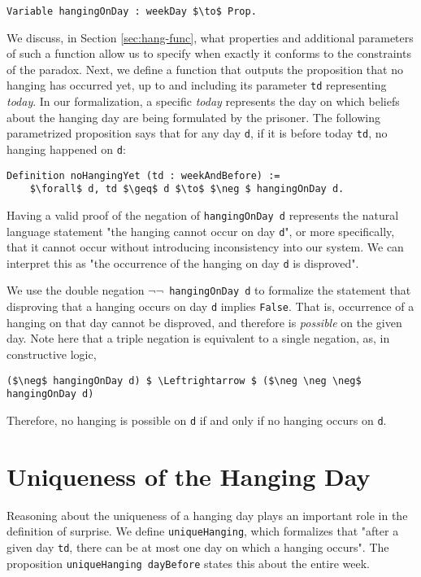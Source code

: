 \documentclass[runningheads]{llncs}
\begin{document}
\begin{lstlisting}[mathescape=true]
  Variable hangingOnDay : weekDay $\to$ Prop.
\end{lstlisting}

We discuss, in Section \ref{sec:hang-func}, what properties and additional parameters of
such a function allow us to specify when exactly it conforms to the constraints of the paradox.
Next, we define a function that outputs the proposition that no hanging has occurred
yet, up to and including its parameter {\tt td} representing \emph{today}.
In our formalization, a specific \emph{today} represents the day on which beliefs about
the hanging day are being formulated by the prisoner.
The following parametrized proposition says that for any day {\tt d}, if it is before today {\tt td}, no hanging
happened on {\tt d}:

\begin{lstlisting}[mathescape=true]
  Definition noHangingYet (td : weekAndBefore) :=
    $\forall$ d, td $\geq$ d $\to$ $\neg $ hangingOnDay d.
\end{lstlisting}

Having a valid proof of the negation of {\tt hangingOnDay d} represents the natural language
statement "the hanging cannot occur on day {\tt d}", or more specifically, that it
cannot occur without introducing inconsistency into our system. We can interpret
this as "the occurrence of the hanging on day {\tt d} is disproved".

We use the double negation {\tt $\neg \neg$ hangingOnDay d} to formalize the statement
that disproving that a hanging occurs on day {\tt d} implies {\tt False}. That is,
occurrence of a hanging on that day cannot be disproved, and therefore is
\emph{possible} on the given day. Note here that a triple negation is
equivalent to a single negation, as, in constructive logic,

\begin{lstlisting}[mathescape=true]
  ($\neg$ hangingOnDay d) $ \Leftrightarrow $ ($\neg \neg \neg$ hangingOnDay d)
\end{lstlisting}

Therefore, no hanging is possible on {\tt d} if and only if no hanging occurs on
{\tt d}.

\section{Uniqueness of the Hanging Day }
\label{sec:unique}

Reasoning about the uniqueness of a hanging day plays an important role in the
definition of surprise.
We define {\tt uniqueHanging}, which formalizes that "after a given day {\tt td},
there can be at most one day on which a hanging occurs". The proposition
{\tt uniqueHanging dayBefore} states this about the entire week.
\end{document}
